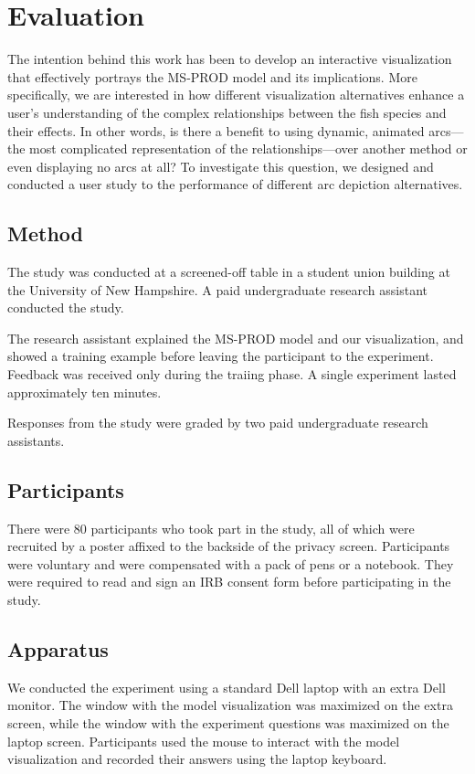 \chapter{Evaluation}

The intention behind this work has been to develop an interactive visualization that effectively portrays the MS-PROD model and its implications.  More specifically, we are interested in how different visualization alternatives enhance a user's understanding of the complex relationships between the fish species and their effects.  In other words, is there a benefit to using dynamic, animated arcs---the most complicated representation of the relationships---over another method or even displaying no arcs at all?  To investigate this question, we designed and conducted a user study to the performance of different arc depiction alternatives.

\section{Method}

The study was conducted at a screened-off table in a student union building at the University of New Hampshire.  A paid undergraduate research assistant conducted the study.

The research assistant explained the MS-PROD model and our visualization, and showed a training example before leaving the participant to the experiment.  Feedback was received only during the traiing phase.  A single experiment lasted approximately ten minutes.

Responses from the study were graded by two paid undergraduate research assistants.

\section{Participants}

There were 80 participants who took part in the study, all of which were recruited by a poster affixed to the backside of the privacy screen.  Participants were voluntary and were compensated with a pack of pens or a notebook.  They were required to read and sign an IRB consent form before participating in the study.

\section{Apparatus}

We conducted the experiment using a standard Dell laptop with an extra Dell monitor.  The window with the model visualization was maximized on the extra screen, while the window with the experiment questions was maximized on the laptop screen.  Participants used the mouse to interact with the model visualization and recorded their answers using the laptop keyboard.

